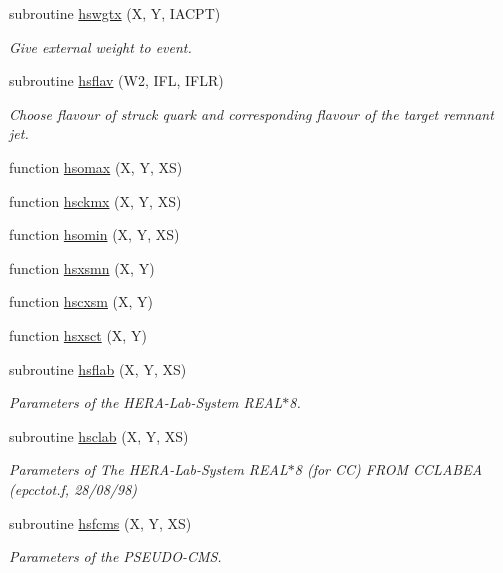 \begin{DoxyCompactItemize}
subroutine \hyperlink{djangoh__h_8f_adec95817ae41b557fdd99a7dd3d415fb}{hswgtx} (X, Y, I\+A\+C\+PT)
\begin{DoxyCompactList}\small\item\em Give external weight to event. \end{DoxyCompactList}\item 
subroutine \hyperlink{djangoh__h_8f_a42edf242e7e178839f71084e9df90f74}{hsflav} (W2, I\+FL, I\+F\+LR)
\begin{DoxyCompactList}\small\item\em Choose flavour of struck quark and corresponding flavour of the target remnant jet. \end{DoxyCompactList}\item 
function \hyperlink{djangoh__h_8f_a1e2d7b195c4234ca54ca731ba1bd5220}{hsomax} (X, Y, XS)
\item 
function \hyperlink{djangoh__h_8f_a1f1037841cdf7240f24c90a08e9e7c32}{hsckmx} (X, Y, XS)
\item 
function \hyperlink{djangoh__h_8f_a43a606f9cb0b8dd04c51c7a254d37865}{hsomin} (X, Y, XS)
\item 
function \hyperlink{djangoh__h_8f_a01f5ab9fb6612cc6091152aa7ecdb730}{hsxsmn} (X, Y)
\item 
function \hyperlink{djangoh__h_8f_a29a47e021209c36a2cbad8581294922e}{hscxsm} (X, Y)
\item 
function \hyperlink{djangoh__h_8f_a437457ea8295156dc0b2bed60e628c57}{hsxsct} (X, Y)
\item 
subroutine \hyperlink{djangoh__h_8f_a9b4f42a37858a1836e8a5353d37b84a4}{hsflab} (X, Y, XS)
\begin{DoxyCompactList}\small\item\em Parameters of the H\+E\+R\+A-\/\+Lab-\/\+System R\+E\+A\+L$\ast$8. \end{DoxyCompactList}\item 
subroutine \hyperlink{djangoh__h_8f_a0f167b5c7522899e009979f4317b7a24}{hsclab} (X, Y, XS)
\begin{DoxyCompactList}\small\item\em Parameters of The H\+E\+R\+A-\/\+Lab-\/\+System R\+E\+A\+L$\ast$8 (for CC) F\+R\+OM C\+C\+L\+A\+B\+EA (epcctot.\+f, 28/08/98) \end{DoxyCompactList}\item 
subroutine \hyperlink{djangoh__h_8f_aca93deed45eb2f3e098f49a98e41a213}{hsfcms} (X, Y, XS)
\begin{DoxyCompactList}\small\item\em Parameters of the P\+S\+E\+U\+D\+O-\/\+C\+MS. \end{DoxyCompactList}\item 

\end{DoxyCompactItemize}
